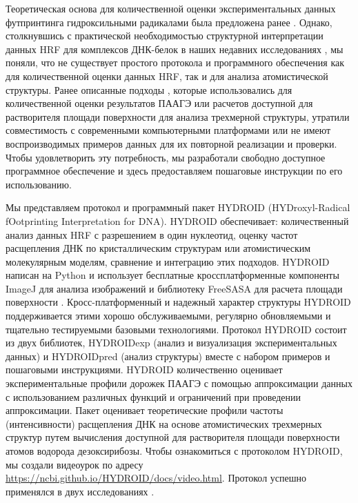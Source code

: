     Теоретическая основа для количественной оценки экспериментальных данных футпринтинга гидроксильными радикалами была предложена ранее \cite{balasubramanian_dna_1998,shadle_quantitative_1997,das_safa_2005,bishop_map_2011}. Однако, столкнувшись с практической необходимостью структурной интерпретации данных HRF для комплексов ДНК-белок в наших недавних исследованиях \cite{shaytan_hydroxyl-radical_2017,xiao_molecular_2017}, мы поняли, что не существует простого протокола и программного обеспечения как для количественной оценки данных HRF, так и для анализа атомистической структуры. Ранее описанные подходы \cite{shadle_quantitative_1997,das_safa_2005}, которые использовались для количественной оценки результатов ПААГЭ или расчетов доступной для растворителя площади поверхности для анализа трехмерной структуры, утратили совместимость с современными компьютерными платформами или не имеют воспроизводимых примеров данных для их повторной реализации и проверки. Чтобы удовлетворить эту потребность, мы разработали свободно доступное программное обеспечение и здесь предоставляем пошаговые инструкции по его использованию.

    Мы представляем протокол и программный пакет HYDROID (HYDroxyl-Radical fOotprinting Interpretation for DNA). HYDROID обеспечивает: количественный анализ данных HRF с разрешением в один нуклеотид, оценку частот расщепления ДНК по кристаллическим структурам или атомистическим молекулярным моделям, сравнение и интеграцию этих подходов. HYDROID написан на Python и использует бесплатные кроссплатформенные компоненты ImageJ для анализа изображений \cite{schneider_nih_2012} и библиотеку FreeSASA для расчета площади поверхности \cite{mitternacht_freesasa_2016}. Кросс-платформенный и надежный характер структуры HYDROID поддерживается этими хорошо обслуживаемыми, регулярно обновляемыми и тщательно тестируемыми базовыми технологиями. Протокол HYDROID состоит из двух библиотек, HYDROIDexp (анализ и визуализация экспериментальных данных) и HYDROIDpred (анализ структуры) вместе с набором примеров и пошаговыми инструкциями. HYDROID количественно оценивает экспериментальные профили дорожек ПААГЭ с помощью аппроксимации данных с использованием различных функций и ограничений при проведении аппроксимации. Пакет оценивает теоретические профили частоты (интенсивности) расщепления ДНК на основе атомистических трехмерных структур путем вычисления доступной для растворителя площади поверхности атомов водорода дезоксирибозы. Чтобы ознакомиться с протоколом HYDROID, мы создали видеоурок по адресу \url{https://ncbi.github.io/HYDROID/docs/video.html}. Протокол успешно применялся в двух исследованиях \cite{shaytan_hydroxyl-radical_2017,xiao_molecular_2017}.

